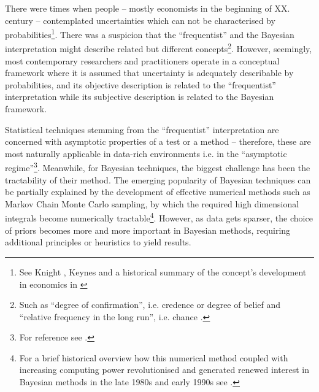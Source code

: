 \documentclass{article}
\begin{document}
There were times when people -- mostly economists in the beginning of XX. century -- contemplated uncertainties which can not be characterised by probabilities\footnote{See Knight \cite{book:Knight}, Keynes \cite{book:TreatiseOnProbability} and a historical summary of the concept's development in economics in \cite{book:JuliaUncertainty}}.
There was a suspicion that the ``frequentist'' and the Bayesian interpretation might describe related but different concepts\footnote{Such as ``degree of confirmation'', i.e. credence or degree of belief and ``relative frequency in the long run'', i.e. chance \cite{sep:Carnap,book:CarnapLogicalFoundationsOfProbability}.}.
However, seemingly, most contemporary researchers and practitioners operate in a conceptual framework where it is assumed that uncertainty is adequately describable by probabilities, and its objective description is related to the ``frequentist'' interpretation while its subjective description is related to the Bayesian framework.

Statistical techniques stemming from the ``frequentist'' interpretation are concerned with asymptotic properties of a test or a method -- therefore, these are most naturally applicable in data-rich environments i.e. in the ``asymptotic regime''\footnote{For reference see \cite{book:AsymptoticStatistics}.}.
Meanwhile, for Bayesian techniques, the biggest challenge has been the tractability of their method. The emerging popularity of Bayesian techniques can be partially explained by the development of effective numerical methods such as Markov Chain Monte Carlo sampling, by which the required high dimensional integrals become numerically tractable\footnote{For a brief historical overview how this numerical method coupled with increasing computing power revolutionised and generated renewed interest in Bayesian methods in the late 1980s and early 1990s see \cite{paper:ShortHistoryOfMCMC}.}. However, as data gets sparser, the choice of priors becomes more and more important in Bayesian methods, requiring additional principles or heuristics to yield results.
\end{document}
